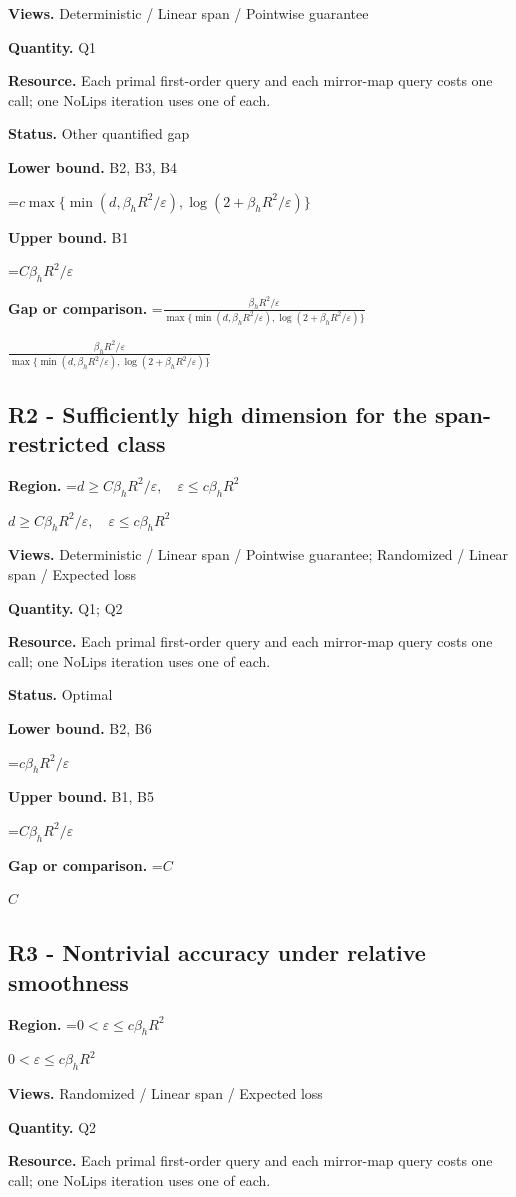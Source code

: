\documentclass[10pt,a4paper]{article}
\newcommand{\AtlasMath}[1]{\par\begingroup\centering\setbox0=\hbox{$\displaystyle #1$}\ifdim\wd0>1.4\linewidth\typeout{ATLAS WIDE FORMULA: \the\wd0}\fi\ifdim\wd0>\linewidth\resizebox{\linewidth}{!}{\box0}\else\box0\fi\par\endgroup}
\newcommand{\AtlasInlineMath}[1]{\begingroup\setbox0=\hbox{$#1$}\ifdim\wd0>.4\linewidth\endgroup\AtlasMath{#1}\else\endgroup$#1$\fi}
\begin{document}
\textbf{Views.} Deterministic / Linear span / Pointwise guarantee

\textbf{Quantity.} Q1

\textbf{Resource.} Each primal first-order query and each mirror-map query costs one call; one NoLips iteration uses one of each.

\textbf{Status.} Other quantified gap

\textbf{Lower bound.} B2, B3, B4

\AtlasMath{c\max\{\min(d,\beta_hR^2/\varepsilon),\log(2+\beta_hR^2/\varepsilon)\}}
\textbf{Upper bound.} B1

\AtlasMath{C\beta_hR^2/\varepsilon}
\textbf{Gap or comparison.} \AtlasInlineMath{\frac{\beta_hR^2/\varepsilon}{\max\{\min(d,\beta_hR^2/\varepsilon),\log(2+\beta_hR^2/\varepsilon)\}}}

\subsection{R2 - Sufficiently high dimension for the span-restricted class}
\textbf{Region.} \AtlasInlineMath{d\ge C\beta_hR^2/\varepsilon,\quad\varepsilon\le c\beta_hR^2}

\textbf{Views.} Deterministic / Linear span / Pointwise guarantee; Randomized / Linear span / Expected loss

\textbf{Quantity.} Q1; Q2

\textbf{Resource.} Each primal first-order query and each mirror-map query costs one call; one NoLips iteration uses one of each.

\textbf{Status.} Optimal

\textbf{Lower bound.} B2, B6

\AtlasMath{c\beta_hR^2/\varepsilon}
\textbf{Upper bound.} B1, B5

\AtlasMath{C\beta_hR^2/\varepsilon}
\textbf{Gap or comparison.} \AtlasInlineMath{C}

\subsection{R3 - Nontrivial accuracy under relative smoothness}
\textbf{Region.} \AtlasInlineMath{0<\varepsilon\le c\beta_hR^2}

\textbf{Views.} Randomized / Linear span / Expected loss

\textbf{Quantity.} Q2

\textbf{Resource.} Each primal first-order query and each mirror-map query costs one call; one NoLips iteration uses one of each.
\end{document}
